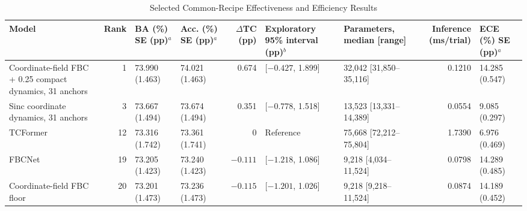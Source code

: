 \documentclass[journal,twoside,web]{template/ieeecolor2-tectonic}
\begin{document}
\begin{table}[t]
\caption{Selected Common-Recipe Effectiveness and Efficiency Results}
\label{tab:selected}
\centering
\scriptsize
\setlength{\tabcolsep}{2.4pt}
\begin{tabular}{@{}p{3.15cm}r>{\raggedleft\arraybackslash}p{1.55cm}>{\raggedleft\arraybackslash}p{1.55cm}rp{2.45cm}p{2.30cm}r>{\raggedleft\arraybackslash}p{1.50cm}@{}}
\toprule
Model & Rank & \shortstack[r]{BA (\%)\\SE (pp)$^a$} & \shortstack[r]{Acc. (\%)\\SE (pp)$^a$} & $\Delta$TC (pp) & Exploratory 95\% interval (pp)$^b$ & Parameters, median [range] & Inference (ms/trial) & \shortstack[r]{ECE (\%)\\SE (pp)$^a$} \\
\midrule
Coordinate-field FBC + 0.25 compact dynamics, 31 anchors & 1 & \shortstack[r]{73.990\\(1.463)} & \shortstack[r]{74.021\\(1.463)} & 0.674 & [$-0.427$, 1.899] & 32,042 [31,850--35,116] & 0.1210 & \shortstack[r]{14.285\\(0.547)} \\
Sinc coordinate dynamics, 31 anchors & 3 & \shortstack[r]{73.667\\(1.494)} & \shortstack[r]{73.674\\(1.494)} & 0.351 & [$-0.778$, 1.518] & 13,523 [13,331--14,389] & 0.0554 & \shortstack[r]{9.085\\(0.297)} \\
TCFormer & 12 & \shortstack[r]{73.316\\(1.742)} & \shortstack[r]{73.361\\(1.741)} & 0 & Reference & 75,668 [72,212--75,804] & 1.7390 & \shortstack[r]{6.976\\(0.469)} \\
FBCNet & 19 & \shortstack[r]{73.205\\(1.423)} & \shortstack[r]{73.240\\(1.423)} & $-0.111$ & [$-1.218$, 1.086] & 9,218 [4,034--11,524] & 0.0798 & \shortstack[r]{14.289\\(0.485)} \\
Coordinate-field FBC floor & 20 & \shortstack[r]{73.201\\(1.473)} & \shortstack[r]{73.236\\(1.473)} & $-0.115$ & [$-1.201$, 1.026] & 9,218 [9,218--11,524] & 0.0874 & \shortstack[r]{14.189\\(0.452)} \\

\end{tabular}
\end{table}
\end{document}
